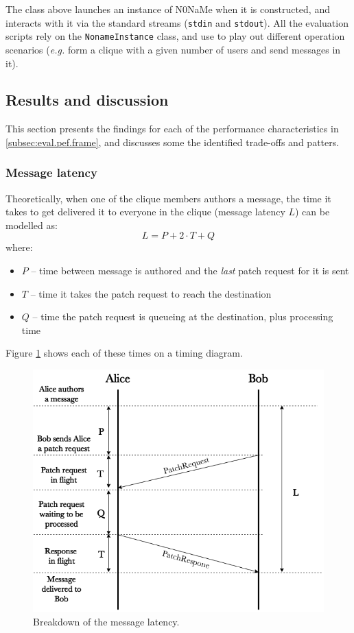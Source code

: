 \documentclass[a4paper, 12pt]{report}
\newcommand{\funkytt}{\fontfamily{AnonymousPro}\selectfont}
\begin{document}
The class above launches an instance of {\funkytt N0NaMe} when it is constructed, and interacts with it via the standard streams (\texttt{stdin} and \texttt{stdout}). All the evaluation scripts rely on the \texttt{NonameInstance} class, and use to play out different operation scenarios (\textit{e.g.} form a clique with a given number of users and send messages in it).

\subsection{Results and discussion}
\label{subsec:eval.perf.results}
This section presents the findings for each of the performance characteristics in \cref{subsec:eval.pef.frame}, and discusses some the identified trade-offs and patters.

\subsubsection{Message latency}
Theoretically, when one of the clique members authors a message, the time it takes to get delivered it to everyone in the clique (message latency $L$) can be modelled as:
\begin{equation}
    L = P + 2 \cdot T + Q
    \label{eqn:latency}
\end{equation}
where:
\begin{itemize}
    \item $P$ -- time between message is authored and the \emph{last} patch request for it is sent
    \item $T$ -- time it takes the patch request to reach the destination
    \item $Q$ -- time the patch request is queueing at the destination, plus processing time
\end{itemize}
Figure \ref{fig:latency} shows each of these times on a timing diagram.

\begin{figure}[H]
    \captionsetup{width=1.0\textwidth}
    \centering
    \includegraphics[width=0.7\linewidth]{pics/eval/latency.png}
    \caption{\label{fig:latency} Breakdown of the message latency.}
\end{figure}
\end{document}
